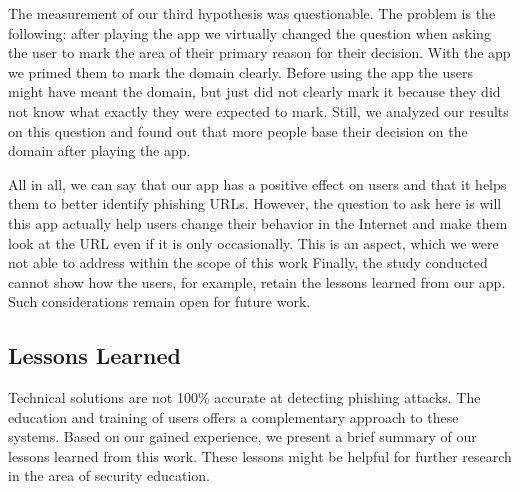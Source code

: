The measurement of our third hypothesis was questionable.
The problem is the following: after playing the app we virtually changed the question when asking the user to mark the area of their primary reason for their decision.
With the app we primed them to mark the domain clearly.
Before using the app the users might have meant the domain, but just did not clearly mark it because they did not know what exactly they were expected to mark.
Still, we analyzed our results on this question and found out that more people base their decision on the domain after playing the app.

All in all, we can say that our app has a positive effect on users and that it helps them to better identify phishing URLs.
However, the question to ask here is will this app actually help users change their behavior in the Internet and make them look at the URL even if it is only occasionally.
This is an aspect, which we were not able to address within the scope of this work
Finally, the study conducted cannot show how the users, for example, retain the lessons learned from our app.
Such considerations remain open for future work.

\subsection{Lessons Learned}
Technical solutions are not 100\% accurate at detecting phishing attacks.
The education and training of users offers a complementary approach to these systems.
Based on our gained experience, we present a brief summary of our lessons learned from this work.
These lessons might be helpful for further research in the area of security education.

